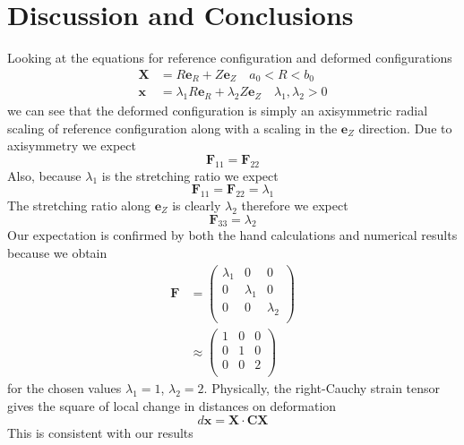 \documentclass[../main.tex]{subfiles}
\begin{document}
        \section{Discussion and Conclusions}
        Looking at the equations for reference configuration and deformed configurations
        \begin{align*}
          \mathbf{X} &= R\mathbf{e}_R + Z\mathbf{e}_Z\quad a_0<R<b_0\\
          \mathbf{x} &= \lambda_1R\mathbf{e}_R+\lambda_2Z\mathbf{e}_Z\quad \lambda_1,\lambda_2 > 0
        \end{align*}
        we can see that the deformed configuration is simply an axisymmetric radial scaling of reference 
        configuration along with a scaling in the $\mathbf{e}_Z$ direction. Due to axisymmetry we expect
        \[\mathbf{F}_{11} = \mathbf{F}_{22}\]
        Also, because $\lambda_1$ is the stretching ratio we expect 
        \[\mathbf{F}_{11}=\mathbf{F}_{22}=\lambda_1\]
        The stretching ratio along $\mathbf{e}_Z$ is clearly $\lambda_2$ therefore we expect
        \[\mathbf{F}_{33}=\lambda_2\]
        Our expectation is confirmed by both the hand calculations and numerical results because we obtain
        \begin{align*}
          \mathbf{F} &=
                       \begin{pmatrix}
                         \lambda_1 & 0  & 0\\
                         0 & \lambda_1 & 0\\
                         0  &  0  & \lambda_2\\
                       \end{pmatrix}\\ &\approx
                                         \begin{pmatrix}
                                           1 & 0 & 0\\
                                           0 & 1 & 0\\
                                           0 & 0 & 2\\
                                         \end{pmatrix}
        \end{align*}
        for the chosen values $\lambda_1 = 1$, $\lambda_2 = 2$.
        Physically, the right-Cauchy strain tensor gives the square of local change in distances on deformation
        \[d\mathbf{x} = \mathbf{X}\cdot\mathbf{C}\mathbf{X}\]
        This is consistent with our results
\end{document}
